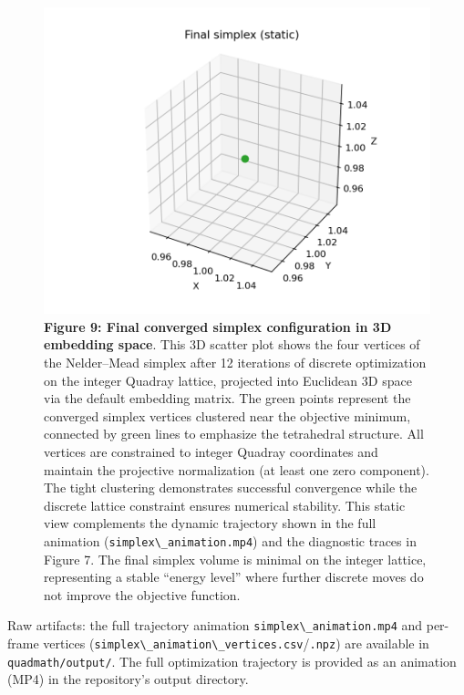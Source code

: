 \documentclass[
  10pt,
]{article}
\newcommand{\passthrough}[1]{#1}
\begin{document}
\begin{figure}
\centering
\includegraphics{../output/figures/simplex_final.png}
\caption{\textbf{Figure 9: Final converged simplex configuration in 3D
embedding space}. This 3D scatter plot shows the four vertices of the
Nelder--Mead simplex after 12 iterations of discrete optimization on the
integer Quadray lattice, projected into Euclidean 3D space via the
default embedding matrix. The green points represent the converged
simplex vertices clustered near the objective minimum, connected by
green lines to emphasize the tetrahedral structure. All vertices are
constrained to integer Quadray coordinates and maintain the projective
normalization (at least one zero component). The tight clustering
demonstrates successful convergence while the discrete lattice
constraint ensures numerical stability. This static view complements the
dynamic trajectory shown in the full animation
(\passthrough{\lstinline!simplex\_animation.mp4!}) and the diagnostic
traces in Figure 7. The final simplex volume is minimal on the integer
lattice, representing a stable ``energy level'' where further discrete
moves do not improve the objective function.}
\end{figure}

Raw artifacts: the full trajectory animation
\passthrough{\lstinline!simplex\_animation.mp4!} and per-frame vertices
(\passthrough{\lstinline!simplex\_animation\_vertices.csv!}/\passthrough{\lstinline!.npz!})
are available in \passthrough{\lstinline!quadmath/output/!}. The full
optimization trajectory is provided as an animation (MP4) in the
repository's output directory.
\end{document}
